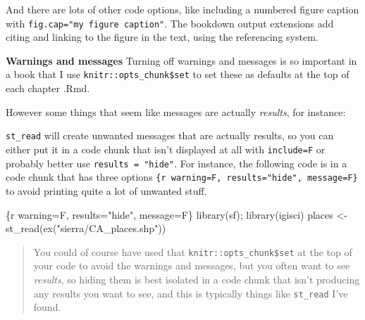 \documentclass[
]{book}
\newenvironment{Shaded}{\begin{snugshade}}{\end{snugshade}}
\newcommand{\NormalTok}[1]{#1}
\begin{document}
And there are lots of other code options, like including a numbered figure caption with \texttt{fig.cap="my\ figure\ caption"}. The bookdown output extensions add citing and linking to the figure in the text, using the referencing system.

\textbf{Warnings and messages}
Turning off warnings and messages is so important in a book that I use \texttt{knitr::opts\_chunk\$set} to set these as defaults at the top of each chapter .Rmd.

\begin{Shaded}
\end{Shaded}

However some things that seem like messages are actually \emph{results}, for instance:

\texttt{st\_read} will create unwanted messages that are actually results, so you can either put it in a code chunk that isn't displayed at all with \texttt{include=F} or probably better use \texttt{results\ =\ "hide"}. For instance, the following code is in a code chunk that has three options \texttt{\{r\ warning=F,\ results="hide",\ message=F\}} to avoid printing quite a lot of unwanted stuff.

\begin{Shaded}
\begin{Highlighting}[]
\NormalTok{\textasciigrave{}\textasciigrave{}\textasciigrave{}\{r warning=F, results="hide", message=F\}}
\NormalTok{library(sf); library(igisci)}
\NormalTok{places \textless{}{-} st\_read(ex("sierra/CA\_places.shp"))}
\NormalTok{\textasciigrave{}\textasciigrave{}\textasciigrave{}}
\end{Highlighting}
\end{Shaded}

\begin{quote}
You could of course have used that \texttt{knitr::opts\_chunk\$set} at the top of your code to avoid the warnings and messages, but you often want to see \emph{results}, so hiding them is best isolated in a code chunk that isn't producing any results you want to see, and this is typically things like \texttt{st\_read} I've found.
\end{quote}
\end{document}
